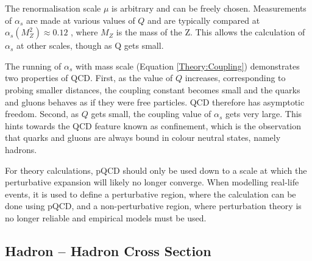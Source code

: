 The renormalisation scale $\mu$ is arbitrary and can be freely chosen.
Measurements of $\alpha_s$ are made at various values of $Q$ and are typically compared at $\alpha_s(M_{Z}^{2})\approx0.12$ \cite{ref:Webber}, where $M_Z$ is the mass of the Z.
This allows the calculation of $\alpha_s$ at other scales, though as Q gets small. 

The running of $\alpha_s$ with mass scale (Equation \ref{Theory:Coupling}) demonstrates two properties of QCD.
First, as the value of $Q$ increases, corresponding to probing smaller distances, the coupling constant becomes small and the quarks and gluons behaves as if they were free particles.
QCD therefore has asymptotic freedom.
Second, as $Q$ gets small, the coupling value of  $\alpha_s$ gets very large.
This hints towards the QCD feature known as confinement, which is the observation that quarks and gluons are always bound in colour neutral states, namely hadrons.

For theory calculations, pQCD should only be used down to a scale at which the perturbative expansion will likely no longer converge.
When modelling real-life events, it is used to define a perturbative region, where the calculation can be done using pQCD, and a non-perturbative region, where perturbation theory is no longer reliable and empirical models must be used. 


\subsection{Hadron -- Hadron Cross Section}


